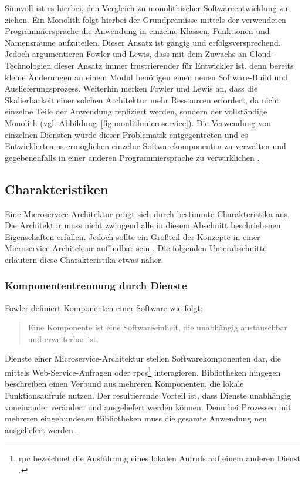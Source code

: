 Sinnvoll ist es hierbei, den Vergleich zu monolithischer Softwareentwicklung zu ziehen. 
Ein Monolith folgt hierbei der Grundprämisse mittels der verwendeten Programmiersprache die Anwendung in einzelne Klassen, Funktionen und Namensräume aufzuteilen. 
Dieser Ansatz ist gängig und erfolgsversprechend. 
Jedoch argumentieren Fowler und Lewis, dass mit dem Zuwachs an Cloud-Technologien dieser Ansatz immer frustrierender für Entwickler ist, denn bereits kleine Änderungen an einem Modul benötigen einen neuen Software-Build und Auslieferungsprozess. 
Weiterhin merken Fowler und Lewis an, dass die Skalierbarkeit einer solchen Architektur mehr Ressourcen erfordert, da nicht einzelne Teile der Anwendung repliziert werden, sondern der vollständige Monolith (vgl. Abbildung~\ref{fig:monlithmicroservice}).
Die Verwendung von einzelnen Diensten würde dieser Problematik entgegentreten und es Entwicklerteams ermöglichen einzelne Softwarekomponenten zu verwalten und gegebenenfalls in einer anderen Programmiersprache zu verwirklichen \cite{FowlerMicroservice}.

\subsection{Charakteristiken}

Eine Microservice-Architektur prägt sich durch bestimmte Charakteristika aus. 
Die Architektur muss nicht zwingend alle in diesem Abschnitt beschriebenen Eigenschaften erfüllen. 
Jedoch sollte ein Großteil der Konzepte in einer Microservice-Architektur auffindbar sein \cite{FowlerMicroservice}. 
Die folgenden Unterabschnitte erläutern diese Charakteristika etwas näher.

\subsubsection{Komponententrennung durch Dienste}\label{TrennungdurchDienste}
Fowler definiert Komponenten einer Software wie folgt: \begin{quote}\glqq Eine Komponente ist eine Softwareeinheit, die unabhängig austauschbar und erweiterbar ist.\grqq{} \cite{FowlerSoftwareComponent} \end{quote}

Dienste einer Microservice-Architektur stellen Softwarekomponenten dar, die mittels Web-Service-Anfragen oder \acp{rpc}\footnote{\acs{rpc} bezeichnet die Ausführung eines lokalen Aufrufs auf einem anderen Dienst \cite{BuildingMicroservicesNewmanChapter5}.} interagieren.
Bibliotheken hingegen beschreiben einen Verbund aus mehreren Komponenten, die lokale Funktionsaufrufe nutzen. 
Der resultierende Vorteil ist, dass Dienste unabhängig voneinander verändert und ausgeliefert werden können. 
Denn bei Prozessen mit mehreren eingebundenen Bibliotheken muss die gesamte Anwendung neu ausgeliefert werden \cite{FowlerMicroservice}. 

